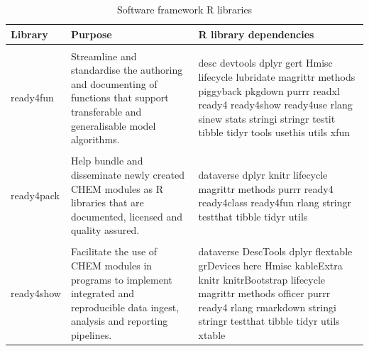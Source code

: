 \documentclass[sn-vancouver,Numbered,pdflatex]{sn-jnl}
\theoremstyle{remark}
\theoremstyle{definition}
\begin{document}
\begin{table}
\centering\centering
\caption{\label{tab:cpkgs}Software framework R libraries}
\centering
\begin{tabular}[t]{l>{\raggedright\arraybackslash}m{20em}>{\raggedright\arraybackslash}m{20em}}
\toprule
Library & Purpose & R library dependencies\\
\midrule
\cellcolor{gray!10}{ready4} & \cellcolor{gray!10}{Provide a template and novel syntax for modular CHEM implementations and tools for finding interoperable CHEM modules, datasets and reproducible analysis programs.} & \cellcolor{gray!10}{dataverse dplyr gh kableExtra lifecycle magrittr methods piggyback purrr rlang rvest stats stringi stringr tibble tidyRSS tidyselect tools utils}\\
\addlinespace
ready4fun & Streamline and standardise the authoring and documenting of functions that support transferable and generalisable model algorithms. & desc devtools dplyr gert Hmisc lifecycle lubridate magrittr methods piggyback pkgdown purrr readxl ready4 ready4show ready4use rlang sinew stats stringi stringr testit tibble tidyr tools usethis utils xfun\\
\addlinespace
\cellcolor{gray!10}{ready4class} & \cellcolor{gray!10}{Streamline and standardise the authoring and documenting of new interoperable CHEM modules.} & \cellcolor{gray!10}{devtools dplyr fs gtools Hmisc knitr lifecycle magrittr methods purrr ready4 ready4fun ready4show rlang stats stringi stringr testit testthat tibble tidyr usethis utils}\\
\addlinespace
ready4pack & Help bundle and disseminate newly created CHEM modules as R libraries that are documented, licensed and quality assured. & dataverse dplyr knitr lifecycle magrittr methods purrr ready4 ready4class ready4fun rlang stringr testthat tibble tidyr utils\\
\addlinespace
\cellcolor{gray!10}{ready4use} & \cellcolor{gray!10}{Help manage the labelling and transfer of data between CHEM modules and local and remote data repositories.} & \cellcolor{gray!10}{data.table dataverse dplyr fs Hmisc knitr lifecycle magrittr methods piggyback purrr readxl ready4 ready4show rlang stats stringi stringr testit testthat tibble tidyr utils}\\
\addlinespace
ready4show & Facilitate the use of CHEM modules in programs to implement integrated and reproducible data ingest, analysis and reporting pipelines. & dataverse DescTools dplyr flextable grDevices here Hmisc kableExtra knitr knitrBootstrap lifecycle magrittr methods officer purrr ready4 rlang rmarkdown stringi stringr testthat tibble tidyr utils xtable\\
\bottomrule
\end{tabular}
\end{table}
\end{document}
